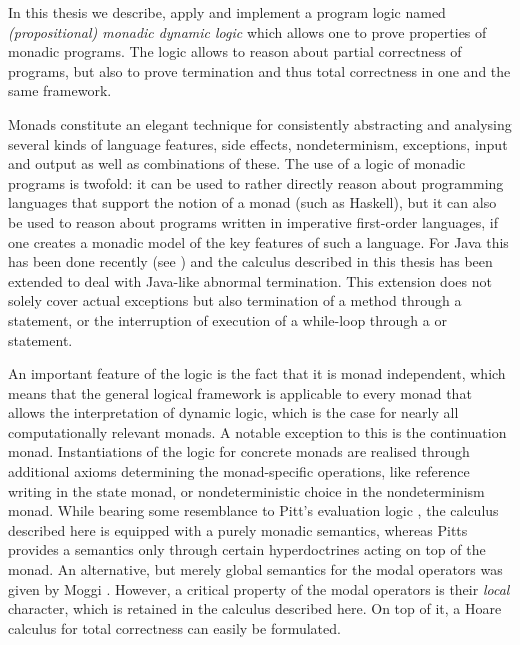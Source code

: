 In this thesis we describe, apply and implement a program logic named
\emph{(propositional) monadic dynamic logic} \cite{SchroederMossakowski:PDL}
which allows one to prove properties of monadic programs.   The
logic allows to reason about partial correctness of programs, but also to prove
termination and thus total correctness in one and the same framework.

Monads constitute an elegant technique for consistently abstracting and analysing
several kinds of language features, \EG side effects, nondeterminism,
exceptions, input and output as well as combinations of these. The use of a
logic of monadic programs is twofold: it can be used to rather directly reason
about programming languages that support the notion of a monad (such as
Haskell), but it can also be used to reason about programs written in imperative
first-order languages, if one creates a monadic model of the key features of
such a language. For Java this has been done recently (see
\cite{HuismanJacobs00}) and the calculus described in this thesis has been
extended to deal with Java-like abnormal termination. This extension does not
solely cover actual exceptions but also termination of a method through a
 statement, or the interruption of execution of a while-loop
through a  or  statement.

An important feature of the logic is the fact that it is monad independent,
which means that the general logical framework is applicable to every monad that
allows the interpretation of dynamic logic, which is the case for nearly all
computationally relevant monads. A notable exception to this is the continuation
monad. Instantiations of the logic for concrete monads are realised through
additional axioms determining the monad-specific operations, like reference
writing in the state monad, or nondeterministic choice in the nondeterminism
monad.  While bearing some resemblance to Pitt's evaluation logic
\cite{Pitts91}, the calculus described here is equipped with a purely monadic
semantics, whereas Pitts provides a semantics only through certain
hyperdoctrines acting on top of the monad. An alternative, but merely global
semantics for the modal operators was given by Moggi \cite{Moggi95}. However, a
critical property of the modal operators is their \emph{local} character, which
is retained in the calculus described here. On top of it, a Hoare calculus for
total correctness can easily be formulated.


